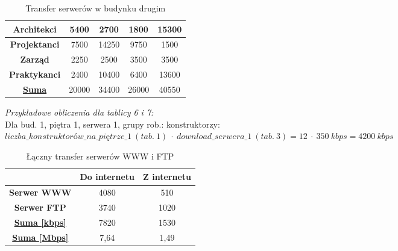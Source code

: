\documentclass[a4paper, 12pt]{article}
\begin{document}
\begin{itemize}
\begin{table}[H]
\begin{tabular}{c|c|c|c|c|}
\multicolumn{1}{|c|}{\textbf{Architekci}}    & 5400                         & 2700                       & 1800                         & 15300                      \\ \hline
\multicolumn{1}{|c|}{\textbf{Projektanci}}   & 7500                         & 14250                      & 9750                         & 1500                       \\ \hline
\multicolumn{1}{|c|}{\textbf{Zarząd}}        & 2250                         & 2500                       & 3500                         & 3500                       \\ \hline
\multicolumn{1}{|c|}{\textbf{Praktykanci}}   & 2400                         & 10400                      & 6400                         & 13600                      \\ \hline
\multicolumn{1}{|c|}{{\ul \textbf{Suma}}}    & 20000                        & 34400                      & 26000                        & 40550                      \\ \hline
\end{tabular}
	\caption{Transfer serwerów w budynku drugim}
\end{table}

\noindent \textit{Przykładowe obliczenia dla tablicy 6 i 7:}\\
Dla bud. 1, piętra 1, serwera 1, grupy rob.: konstruktorzy:\\
\(liczba\_konstruktorów\_na\_piętrze\_1\ (tab.\ 1)\ \cdot\ download\_serwera\_1\ (tab.\ 3) = 12\ \cdot\ 350\ kbps = 4200\ kbps\)\\

\begin{table}[H]
	\centering
	\begin{tabular}{c|c|c|}
\cline{2-3}
                                                     & \textbf{Do internetu} & \textbf{Z internetu} \\ \hline
\multicolumn{1}{|c|}{\textbf{Serwer WWW}}                     & 4080         & 510         \\ \hline
\multicolumn{1}{|c|}{\textbf{Serwer FTP}}                     & 3740         & 1020        \\ \hline
\multicolumn{1}{|c|}{{\ul \textbf{Suma {[}kbps{]}}}} & 7820         & 1530        \\ \hline
\multicolumn{1}{|c|}{{\ul \textbf{Suma {[}Mbps{]}}}} & 7,64         & 1,49        \\ \hline
\end{tabular}
	\caption{Łączny transfer serwerów WWW i FTP}
\end{table}


\end{itemize}
\end{document}
